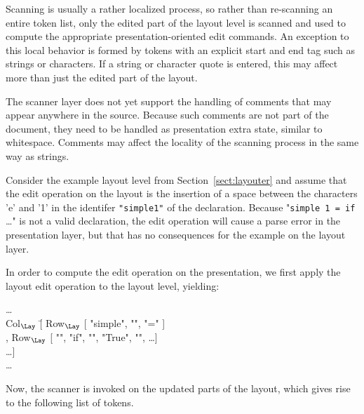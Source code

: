 Scanning is usually a rather localized process, so rather than re-scanning an entire token list, only the edited part of the layout level is scanned and used to compute the appropriate presentation-oriented edit commands. An exception to this local behavior is formed by tokens with an explicit start and end tag such as strings or characters. If a string or character quote is entered, this may affect more than just the edited part of the layout.

The scanner layer does not yet support the handling of comments that may appear anywhere in the source. Because such comments are not part of the document, they need to be handled as presentation extra state, similar to whitespace. Comments may affect the locality of the scanning process in the same way as strings.


Consider the example layout level from Section~\ref{sect:layouter} and assume that the edit operation on the layout is the insertion of a space between the characters 'e' and '1' in the identifer \verb|"simple1"| of the declaration. Because "\verb|simple 1 = if |\dots" is not a valid declaration, the edit operation will cause a parse error in the presentation layer, but that has no consequences for the example on the layout layer.

In order to compute the edit operation on the presentation, we first apply the layout edit operation to the layout level, yielding:

\small \ttfamily
\begin{tabbing}
\dots\\
Col$_{\Lay}$ \= [ Row$_{\Lay}$ [ "simple", "\textvisiblespace", "=" ]\\
                   \> , Row$_{\Lay}$ [ "\textvisiblespace\textvisiblespace", 
                                                 "if", "\textvisiblespace", "True", "\textvisiblespace", \dots ] \\
                   \> \dots ]\\
\dots
\end{tabbing}
\rmfamily \normalsize

Now, the scanner is invoked on the updated parts of the layout, which gives rise to the following list of tokens.

